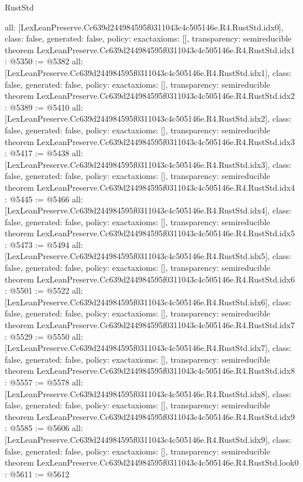\begin{lexlean}{RustStd}
\begin{coremodule}
{  all: [LexLeanPreserve.Cc639d244984595f0311043c4c505146e.R4.RustStd.idx0],
  class: false,
  generated: false,
  policy: exact{axioms: []},
  transparency: semireducible
}
theorem LexLeanPreserve.Cc639d244984595f0311043c4c505146e.R4.RustStd.idx1 : @5350 := @5382 {
  all: [LexLeanPreserve.Cc639d244984595f0311043c4c505146e.R4.RustStd.idx1],
  class: false,
  generated: false,
  policy: exact{axioms: []},
  transparency: semireducible
}
theorem LexLeanPreserve.Cc639d244984595f0311043c4c505146e.R4.RustStd.idx2 : @5389 := @5410 {
  all: [LexLeanPreserve.Cc639d244984595f0311043c4c505146e.R4.RustStd.idx2],
  class: false,
  generated: false,
  policy: exact{axioms: []},
  transparency: semireducible
}
theorem LexLeanPreserve.Cc639d244984595f0311043c4c505146e.R4.RustStd.idx3 : @5417 := @5438 {
  all: [LexLeanPreserve.Cc639d244984595f0311043c4c505146e.R4.RustStd.idx3],
  class: false,
  generated: false,
  policy: exact{axioms: []},
  transparency: semireducible
}
theorem LexLeanPreserve.Cc639d244984595f0311043c4c505146e.R4.RustStd.idx4 : @5445 := @5466 {
  all: [LexLeanPreserve.Cc639d244984595f0311043c4c505146e.R4.RustStd.idx4],
  class: false,
  generated: false,
  policy: exact{axioms: []},
  transparency: semireducible
}
theorem LexLeanPreserve.Cc639d244984595f0311043c4c505146e.R4.RustStd.idx5 : @5473 := @5494 {
  all: [LexLeanPreserve.Cc639d244984595f0311043c4c505146e.R4.RustStd.idx5],
  class: false,
  generated: false,
  policy: exact{axioms: []},
  transparency: semireducible
}
theorem LexLeanPreserve.Cc639d244984595f0311043c4c505146e.R4.RustStd.idx6 : @5501 := @5522 {
  all: [LexLeanPreserve.Cc639d244984595f0311043c4c505146e.R4.RustStd.idx6],
  class: false,
  generated: false,
  policy: exact{axioms: []},
  transparency: semireducible
}
theorem LexLeanPreserve.Cc639d244984595f0311043c4c505146e.R4.RustStd.idx7 : @5529 := @5550 {
  all: [LexLeanPreserve.Cc639d244984595f0311043c4c505146e.R4.RustStd.idx7],
  class: false,
  generated: false,
  policy: exact{axioms: []},
  transparency: semireducible
}
theorem LexLeanPreserve.Cc639d244984595f0311043c4c505146e.R4.RustStd.idx8 : @5557 := @5578 {
  all: [LexLeanPreserve.Cc639d244984595f0311043c4c505146e.R4.RustStd.idx8],
  class: false,
  generated: false,
  policy: exact{axioms: []},
  transparency: semireducible
}
theorem LexLeanPreserve.Cc639d244984595f0311043c4c505146e.R4.RustStd.idx9 : @5585 := @5606 {
  all: [LexLeanPreserve.Cc639d244984595f0311043c4c505146e.R4.RustStd.idx9],
  class: false,
  generated: false,
  policy: exact{axioms: []},
  transparency: semireducible
}
theorem LexLeanPreserve.Cc639d244984595f0311043c4c505146e.R4.RustStd.look0 : @5611 := @5612 {
}
\end{coremodule}
\end{lexlean}
